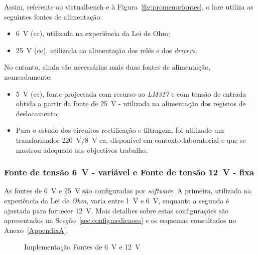 Assim, referente ao \acrshort{virtualbench} e à Figura~\ref{fig:promenorfontes}, o \acrshort{lare} utiliza as seguintes fontes de alimentação:
\begin{itemize}
	\item \SI{6}{\volt} (\acrshort{cc}), utilizada na experiência da Lei de Ohm;
	\item \SI{25}{\volt} (\acrshort{cc}), utilizada na alimentação dos relés e dos \textit{drivers}.
\end{itemize}

No entanto, ainda são necessárias mais duas fontes de alimentação, nomeadamente:
\begin{itemize}
	\item \SI{5}{\volt} (\acrshort{cc}), fonte projectada com recurso ao \textit{LM317} e com tensão de entrada obtida a partir da fonte de \SI{25}{\volt} - utilizada na alimentação dos registos de deslocamento;
	\item Para o estudo dos circuitos rectificação e filtragem, foi utilizado um transformador \SI{220}{\volt}/\SI{8}{\volt} \acrshort{ca}, disponível em contexto laboratorial e que se mostrou adequado aos objectivos trabalho.
\end{itemize}

\subsubsection{Fonte de tensão \SI{6}{\volt} - variável e {Fonte de tensão \SI{12}{\volt} - fixa}}
\label{sec:fontes6-12}
As fontes de \SI{6}{\volt} e \SI{25}{\volt} são configuradas por \textit{software}. A primeira, utilizada na experiência da Lei de \textit{Ohm}, varia entre \SI{1}{\volt} e \SI{6}{\volt}, enquanto a segunda é ajustada para fornecer \SI{12}{\volt}. Mais detalhes sobre estas configurações são apresentados na Secção~\ref{sec:configmedicaoes} e os esquemas consultados no Anexo~\ref{AppendixA}.

\begin{figure}[hbtp]
	\centering%
		\centering
		\qquad
		\caption{Implementação Fontes de \SI{6}{\volt} e \SI{12}{\volt}}%
		\label{fig:fontes6-12}%
	\end{figure}

